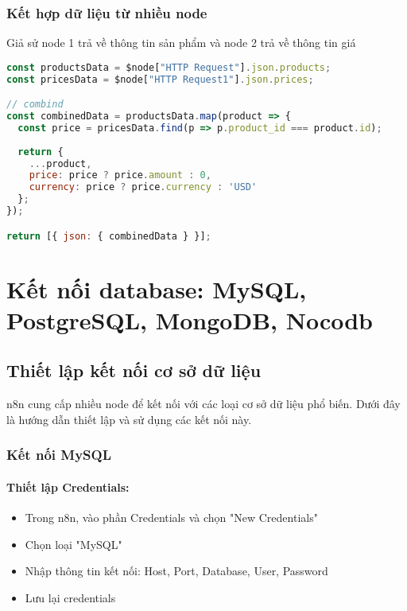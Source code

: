 \subsubsection{Kết hợp dữ liệu từ nhiều node}

Giả sử node 1 trả về thông tin sản phẩm và node 2 trả về thông tin giá

\begin{lstlisting}[language=JavaScript]
const productsData = $node["HTTP Request"].json.products;
const pricesData = $node["HTTP Request1"].json.prices;

// combind
const combinedData = productsData.map(product => {
  const price = pricesData.find(p => p.product_id === product.id);
  
  return {
    ...product,
    price: price ? price.amount : 0,
    currency: price ? price.currency : 'USD'
  };
});

return [{ json: { combinedData } }];
\end{lstlisting}

\section{Kết nối database: MySQL, PostgreSQL, MongoDB, Nocodb}

\subsection{Thiết lập kết nối cơ sở dữ liệu}

n8n cung cấp nhiều node để kết nối với các loại cơ sở dữ liệu phổ biến. Dưới đây là hướng dẫn thiết lập và sử dụng các kết nối này.

\subsubsection{Kết nối MySQL}

\paragraph{Thiết lập Credentials:}
\begin{itemize}
    \item Trong n8n, vào phần Credentials và chọn "New Credentials"
    \item Chọn loại "MySQL"
    \item Nhập thông tin kết nối: Host, Port, Database, User, Password
    \item Lưu lại credentials
\end{itemize}

